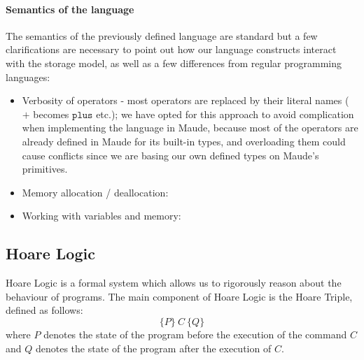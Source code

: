 \documentclass[12pt,a4paper]{article}
\begin{document}
\paragraph{Semantics of the language}
The semantics of the previously defined language are standard but a few clarifications are necessary to point out how our language constructs interact with the storage model, as well as a few differences from regular programming languages:
\begin{itemize}
	\item{Verbosity of operators - most operators are replaced by their literal names ( \(+\) becomes \(\mathtt{plus}\) etc.); we have opted for this approach to avoid complication when implementing the language in Maude, because most of the operators are already defined in Maude for its built-in types, and overloading them could cause conflicts since we are basing our own defined types on Maude's primitives.}
	\item{Memory allocation / deallocation: }
	\item{Working with variables and memory: }
\end{itemize}
\subsection{Hoare Logic}
Hoare Logic is a formal system which allows us to rigorously reason about the behaviour of programs.
The main component of Hoare Logic is the Hoare Triple, defined as follows:
\[ \{P\}\  C\  \{Q\} \]
where \(P\) denotes the state of the program before the execution of the command \(C\) and \(Q\) denotes the state of the program after the execution of \(C\). \\
\end{document}
